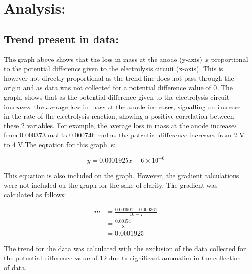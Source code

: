 \documentclass[11pt, a4]{article}
\begin{document}
	\section{Analysis:}
		\subsection{Trend present in data:}
			The graph above shows that the loss in mass at the anode (y-axis) is proportional to the potential difference given to the electrolysis circuit (x-axis). This is however not directly proportional as the trend line does not pass through the origin and as data was not collected for a potential difference value of 0. The graph, shows that as the potential difference given to the electrolysis circuit increases, the average loss in mass at the anode increases, signalling an increase in the rate of the electrolysis reaction, showing a positive correlation between these 2 variables. For example, the average loss in mass at the anode increases from 0.000373 mol to 0.000746 mol as the potential difference increases from 2 V to 4 V.The equation for this graph is:
			
			\begin{equation}
				y = 0.0001925x - 6 \times 10^{-6}
			\end{equation}
			
			This equation is also included on the graph. However, the gradient calculations were not included on the graph for the sake of clarity. The gradient was calculated as follows:
			
			\begin{equation*}
			 	\begin{split}
			 		m &= \frac{0.001901-0.000361}{10-2}\\
			 		&= \frac{0.00154}{8}\\
			 		&= 0.0001925
			 	\end{split}
			\end{equation*}
			
			The trend for the data was calculated with the exclusion of the data collected for the potential difference value of 12 due to significant anomalies in the collection of data.
			
\end{document}
